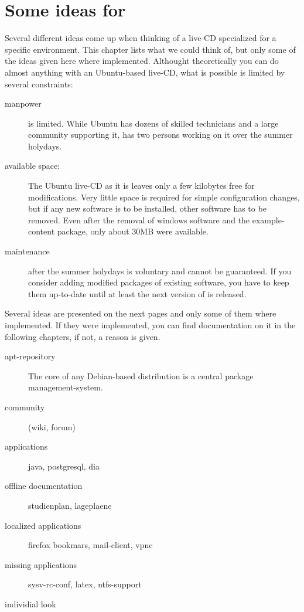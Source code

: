 
\chapter{Some ideas for \tunix}
Several different ideas come up when thinking of a live-CD specialized for a
specific environment. This chapter lists what we could think of, but only some
of the ideas given here where implemented. Althought theoretically you can do
almost anything with an Ubuntu-based live-CD, what is possible is limited by
several constraints:
\begin{description}
 \item[manpower] is limited. While Ubuntu has dozens of skilled technicians and
   a large community supporting it, \tunix has two persons working on it over
   the summer holydays.
 \item[available space:] The Ubuntu live-CD as it is leaves only a few kilobytes
   free for modifications. Very little space is required for simple
   configuration changes, but if any new software is to be installed, other
   software has to be removed. Even after the removal of windows software and the
   example-content package, only about 30MB were available.
 \item[maintenance] after the summer holydays is voluntary and cannot be
   guaranteed. If you consider adding modified packages of existing software,
   you have to keep them up-to-date until at least the next version of \tunix is
   released.
\end{description}
Several ideas are presented on the next pages and only some of them where
implemented. If they were implemented, you can find documentation on it in the
following chapters, if not, a reason is given.
\begin{description}
  \item[apt-repository] The core of any Debian-based distribution is a central
    package management-system. 
  \item[community] (wiki, forum)
  \item[applications] java, postgresql, dia
  \item[offline documentation] studienplan, lageplaene
  \item[localized applications] firefox bookmars, mail-client, vpnc
  \item[missing applications] sysv-rc-conf, latex, ntfs-support
  \item[individial look]
\end{description}


